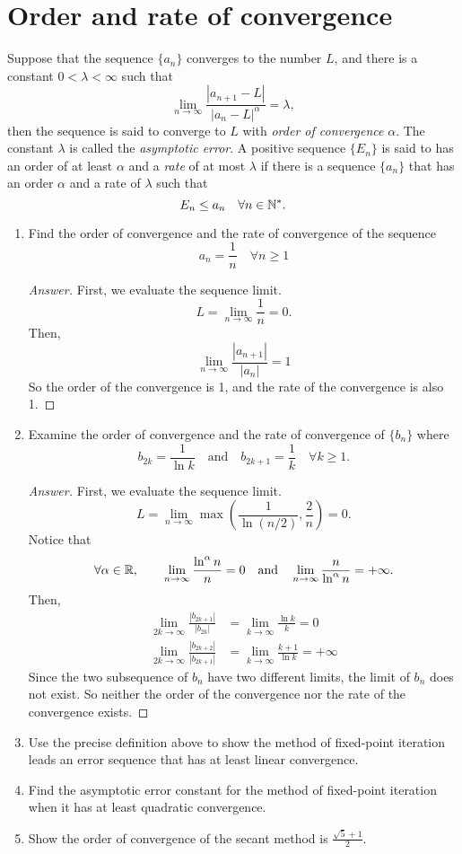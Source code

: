 \section{Order and rate of convergence}
Suppose that the sequence \(\{a_n\}\) converges to the number $L$, and there is a constant \(0<\lambda<\infty\) such that
\[ \lim_{n\to\infty} \frac{|a_{n+1}-L|}{|a_n-L|^\alpha}=\lambda, \]
then the sequence is said to converge to $L$ with \emph{order of convergence} $\alpha$.
The constant $\lambda$ is called the \emph{asymptotic error}.
A positive sequence \(\{E_n\}\) is said to has an order of at least $\alpha$ and a \emph{rate} of at most $\lambda$ if there is a sequence \(\{a_n\}\) that has an order $\alpha$ and a rate of $\lambda$ such that
\[ E_n\leq a_n \quad \forall n\in\mathbb{N}^*. \]
\begin{enumerate}
	\item Find the order of convergence and the rate of convergence of the sequence
	\[ a_n=\frac{1}{n} \quad \forall n\geq1 \]
	\begin{proof}[Answer]
	First, we evaluate the sequence limit.
	\[ L=\lim_{n\to\infty}\frac{1}{n}=0. \]
	Then,
	\[ \lim_{n\to\infty}\frac{|a_{n+1}|}{|a_n|}=1 \]
	So the order of the convergence is 1, and the rate of the convergence is also 1.
	\end{proof}
	\item Examine the order of convergence and the rate of convergence of \(\{b_n\}\) where
	\[ b_{2k}=\frac{1}{\ln k} \quad \text{and} \quad b_{2k+1}=\frac{1}{k} \quad \forall k\geq1. \]
	\begin{proof}[Answer]
	First, we evaluate the sequence limit.
	\[ L=\lim_{n\to\infty}\max\left(\frac{1}{\ln (n/2)},\frac{2}{n}\right)=0. \]
	Notice that
	\[ \forall \alpha\in\mathbb{R},\qquad \lim_{n\to\infty}\frac{\ln^\alpha n}{n}=0 \quad\text{and}\quad \lim_{n\to\infty}\frac{n}{\ln^\alpha n}=+\infty. \]
	Then,
	\begin{align*}
		\lim_{2k\to\infty}\frac{|b_{2k+1}|}{|b_{2k}|}&=\lim_{k\to\infty}\frac{\ln k}{k}=0\\
		\lim_{2k\to\infty}\frac{|b_{2k+2}|}{|b_{2k+1}|}&=\lim_{k\to\infty}\frac{k+1}{\ln k}=+\infty
	\end{align*}
	Since the two subsequence of \(b_n\) have two different limits, the limit of \(b_n\) does not exist.
	So neither the order of the convergence nor the rate of the convergence exists.
	\end{proof}
	\item Use the precise definition above to show the method of fixed-point iteration leads an error sequence that has at least linear convergence.
	\item Find the asymptotic error constant for the method of fixed-point iteration when it has at least quadratic convergence.
	\item Show the order of convergence of the secant method is \(\frac{\sqrt{5}+1}{2} \).
\end{enumerate}


